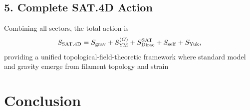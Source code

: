 \subsection*{5. Complete SAT.4D Action}
Combining all sectors, the total action is
\[
S_{\rm SAT.4D}
= S_{\rm grav} + S_{\rm YM}^{(G)} + S_{\rm Dirac}^{\rm SAT} + S_{\rm self} + S_{\rm Yuk},
\]
providing a unified topological-field-theoretic framework where standard model and gravity emerge from filament topology and strain

\section{Conclusion}